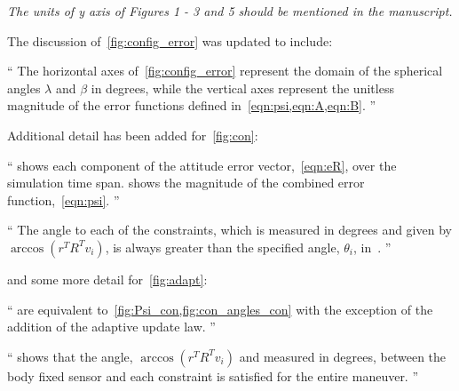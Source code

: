 \documentclass[11pt]{article}
\newenvironment{correction}{\begin{list}{}{\setlength{\leftmargin}{1cm}\setlength{\rightmargin}{1cm}}\vspace{\parsep}\item[]``}{''\end{list}}
\begin{document}
\begin{enumerate}
\item \textit{The units of y axis of Figures 1 - 3 and 5 should be mentioned in the manuscript.}

The discussion of~\cref{fig:config_error} was updated to include:
\begin{correction}
    The horizontal axes of~\cref{fig:config_error} represent the domain of the spherical angles \( \lambda \) and \( \beta \) in degrees, while the vertical axes represent the unitless magnitude of the error functions defined in~\cref{eqn:psi,eqn:A,eqn:B}.    
\end{correction}

Additional detail has been added for~\cref{fig:con}:
\begin{correction}
     shows each component of the attitude error vector,~\cref{eqn:eR}, over the simulation time span.
     shows the  magnitude of the combined error function,~\cref{eqn:psi}.
\end{correction}
\begin{correction}
    The angle to each of the constraints, which is measured in degrees and given by \( \arccos(r^T R^T v_i) \), is always greater than the specified angle, \( \theta_i \), in~.
\end{correction}
and some more detail for~\cref{fig:adapt}:
\begin{correction}
     are equivalent to~\cref{fig:Psi_con,fig:con_angles_con} with the exception of the addition of the adaptive update law.
\end{correction}
\begin{correction}
     shows that the angle, \( \arccos(r^T R^T v_i) \) and measured in degrees, between the body fixed sensor and each constraint is satisfied for the entire maneuver.
\end{correction}


\end{enumerate}
\end{document}
